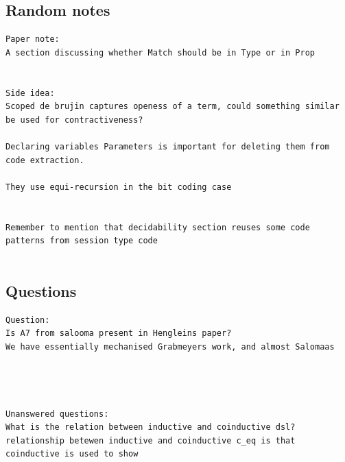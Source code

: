 \documentclass[a4paper,UKenglish,cleveref, autoref, thm-restate]{lipics-v2021}
\begin{document}
\subsection{Random notes}
\begin{verbatim}
Paper note:
A section discussing whether Match should be in Type or in Prop


Side idea:
Scoped de brujin captures openess of a term, could something similar be used for contractiveness?

Declaring variables Parameters is important for deleting them from code extraction.

They use equi-recursion in the bit coding case


Remember to mention that decidability section reuses some code patterns from session type code


\end{verbatim}



\subsection{Questions}
\begin{verbatim}
Question:
Is A7 from salooma present in Hengleins paper?
We have essentially mechanised Grabmeyers work, and almost Salomaas 




Unanswered questions:
What is the relation between inductive and coinductive dsl? 
relationship betewen inductive and coinductive c_eq is that coinductive is used to show 




\end{verbatim}



\end{document}
